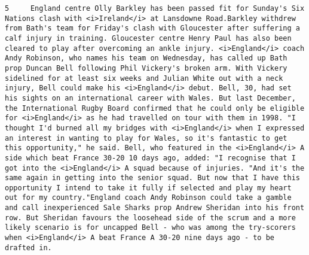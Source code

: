 \documentclass[11pt]{article}
\begin{document}
\begin{Verbatim}[commandchars=\\\{\}]
         5     England centre Olly Barkley has been passed fit for Sunday's Six Nations clash with <i>Ireland</i> at Lansdowne Road.Barkley withdrew from Bath's team for Friday's clash with Gloucester after suffering a calf injury in training. Gloucester centre Henry Paul has also been cleared to play after overcoming an ankle injury. <i>England</i> coach Andy Robinson, who names his team on Wednesday, has called up Bath prop Duncan Bell following Phil Vickery's broken arm. With Vickery sidelined for at least six weeks and Julian White out with a neck injury, Bell could make his <i>England</i> debut. Bell, 30, had set his sights on an international career with Wales. But last December, the International Rugby Board confirmed that he could only be eligible for <i>England</i> as he had travelled on tour with them in 1998. "I thought I'd burned all my bridges with <i>England</i> when I expressed an interest in wanting to play for Wales, so it's fantastic to get this opportunity," he said. Bell, who featured in the <i>England</i> A side which beat France 30-20 10 days ago, added: "I recognise that I got into the <i>England</i> A squad because of injuries. "And it's the same again in getting into the senior squad. But now that I have this opportunity I intend to take it fully if selected and play my heart out for my country."England coach Andy Robinson could take a gamble and call inexperienced Sale Sharks prop Andrew Sheridan into his front row. But Sheridan favours the loosehead side of the scrum and a more likely scenario is for uncapped Bell - who was among the try-scorers when <i>England</i> A beat France A 30-20 nine days ago - to be drafted in.                                                                                                                                                                                                                                                                                                                                                                                                                                                                                                                                                                                                                                                                                                                                                                                                                                                                                                                                                                                                                                                                                                                                                                                                                                                                                                                                                                                                                                                                                                                                                                                                                                                                                        
\end{Verbatim}
\end{document}
